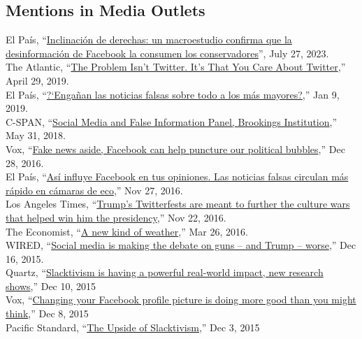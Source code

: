 \documentclass[margin,line,11pt]{resume}
\newcommand{\nl}{\vspace{0.10in}\\}
\begin{document}
\begin{resume}
                \section{\mysidestyle Mentions in Media Outlets}
El Pa\'{i}s, ``\href{https://elpais.com/tecnologia/2023-07-27/inclinacion-de-derechas-un-macroestudio-confirma-que-la-desinformacion-de-facebook-la-consumen-los-conservadores.html}{Inclinación de derechas: un macroestudio confirma que la desinformación de Facebook la consumen los conservadores}'', July 27, 2023.\nl                
The Atlantic, ``\href{https://www.theatlantic.com/ideas/archive/2019/04/political-leaders-should-stop-caring-about-twitter/588004/}{The Problem Isn't Twitter. It's That You Care About Twitter},'' April 29, 2019.\nl
El Pa\'{i}s, ``\href{https://elpais.com/tecnologia/2019/01/09/actualidad/1547029983_955487.html}{?`Enga\~{n}an las noticias falsas sobre todo a los m\'{a}s mayores?},'' Jan 9, 2019.\nl
C-SPAN, ``\href{https://www.c-span.org/video/?446330-3/social-media-false-information-panel-2}{Social Media and False Information Panel, Brookings Institution},'' May 31, 2018.\nl                
Vox, ``\href{http://www.vox.com/the-big-idea/2016/12/28/14095452/fake-news-political-bubbles-democracy-facebook}{Fake news aside, Facebook can help puncture our political bubbles},'' Dec 28, 2016.\nl
El Pa\'{i}s, ``\href{http://internacional.elpais.com/internacional/2016/11/25/actualidad/1480095728_565471.html}{As\'{i} influye Facebook en tus opiniones. Las noticias falsas circulan m\'{a}s r\'{a}pido en c\'{a}maras de eco},'' Nov 27, 2016.\nl
Los Angeles Times, ``\href{http://www.latimes.com/politics/la-na-pol-trump-twitter-20161122-story.html}{Trump's Twitterfests are meant to further the culture wars that helped win him the presidency},'' Nov 22, 2016.\nl 
The Economist, ``\href{http://www.economist.com/news/special-report/21695192-social-media-now-play-key-role-collective-action-new-kind-weather}{A new kind of weather},'' Mar 26, 2016.\nl
WIRED, ``\href{http://www.wired.com/2015/12/social-media-is-making-the-debate-on-guns-and-trump-worse/}{Social media is making the debate on guns -- and Trump -- worse},'' Dec 16, 2015.\nl
Quartz, ``\href{http://qz.com/570009/slacktivism-is-having-a-powerful-real-world-impact-new-research-shows/}{Slacktivism is having a powerful real-world impact, new research shows},'' Dec 10, 2015\nl
Vox, ``\href{http://www.vox.com/2015/12/8/9873822/social-media-activism-science}{Changing your Facebook profile picture is doing more good than you might think},'' Dec 8, 2015\nl
Pacific Standard, ``\href{https://psmag.com/the-upside-of-slacktivism-2a93294941b0#.hp2xyepdf}{The Upside of Slacktivism},'' Dec 3, 2015\nl

\end{resume}
\end{document}
